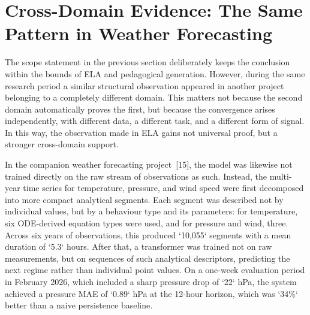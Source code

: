 \documentclass[12pt,a4paper,oneside]{report}
\begin{document}
\section{Cross-Domain Evidence: The Same Pattern in Weather Forecasting}

The scope statement in the previous section deliberately keeps the conclusion within the bounds of ELA and pedagogical generation. However, during the same research period a similar structural observation appeared in another project belonging to a completely different domain. This matters not because the second domain automatically proves the first, but because the convergence arises independently, with different data, a different task, and a different form of signal. In this way, the observation made in ELA gains not universal proof, but a stronger cross-domain support.

In the companion weather forecasting project~[15], the model was likewise not trained directly on the raw stream of observations as such. Instead, the multi-year time series for temperature, pressure, and wind speed were first decomposed into more compact analytical segments. Each segment was described not by individual values, but by a behaviour type and its parameters: for temperature, six ODE-derived equation types were used, and for pressure and wind, three. Across six years of observations, this produced `10,055` segments with a mean duration of `5.3` hours. After that, a transformer was trained not on raw measurements, but on sequences of such analytical descriptors, predicting the next regime rather than individual point values. On a one-week evaluation period in February 2026, which included a sharp pressure drop of `22` hPa, the system achieved a pressure MAE of `0.89` hPa at the 12-hour horizon, which was `34\%` better than a naive persistence baseline.
\end{document}
